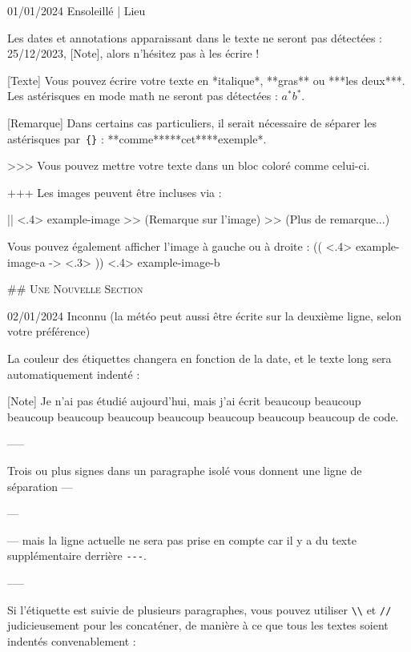 \documentclass[11pt, paperstyle=light yellow, color entry, day-month-year,
  title in boldface, title in sffamily, use style = classical]{jwjournal}
\begin{document}
01/01/2024 Ensoleillé | Lieu

  Les dates et annotations apparaissant dans le texte ne seront pas détectées : 25/12/2023, [Note], alors n'hésitez pas à les écrire !

  [Texte]
    Vous pouvez écrire votre texte en *italique*, **gras** ou ***les deux***.
    \\
    Les astérisques en mode math ne seront pas détectées : $a^* b^*$.

  [Remarque] Dans certains cas particuliers, il serait nécessaire de séparer les astérisques par~\texttt{\{\}} : **comme**{}***cet***{}*exemple*.

  >>> Vous pouvez mettre votre texte dans un bloc coloré comme celui-ci.

  +++
  Les images peuvent être incluses via :

  || <.4> {example-image} %
  >> (Remarque sur l'image)
  >> (Plus de remarque...)

  Vous pouvez également afficher l'image à gauche ou à droite :
  (( <.4> {example-image-a} %
  -> <.3> %
  )) <.4> {example-image-b} %


## {\textsc{Une Nouvelle Section}}

02/01/2024
Inconnu (la météo peut aussi être écrite sur la deuxième ligne, selon votre préférence)

  La couleur des étiquettes changera en fonction de la date, et le texte long sera automatiquement indenté :

  [Note] Je n'ai pas étudié aujourd'hui, mais j'ai écrit beaucoup beaucoup beaucoup beaucoup beaucoup beaucoup beaucoup beaucoup beaucoup de code.

  -----

  Trois ou plus \textquote{\texttt{-}} signes dans un paragraphe isolé vous donnent une ligne de séparation ---

  ---

  --- mais la ligne actuelle ne sera pas prise en compte car il y a du texte supplémentaire derrière \texttt{-}\texttt{-}\texttt{-}.

  -----

  Si l'étiquette est suivie de plusieurs paragraphes, vous pouvez utiliser \texttt{\textbackslash\textbackslash} et \texttt{\slash\slash} judicieusement pour les concaténer, de manière à ce que tous les textes soient indentés convenablement :
\end{document}
